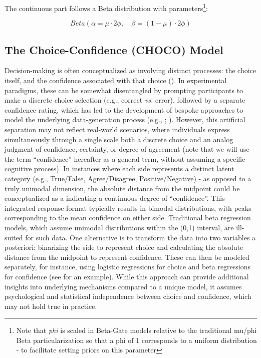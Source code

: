 \documentclass[
  jou,
  floatsintext,
  longtable,
  nolmodern,
  notxfonts,
  notimes,
  colorlinks=true,linkcolor=blue,citecolor=blue,urlcolor=blue]{apa7}
\begin{document}
The continuous part follows a Beta distribution with
parameters\footnote{Note that \emph{phi} is scaled in Beta-Gate models
  relative to the traditional mu/phi Beta particularization so that a
  phi of 1 corresponds to a uniform distribution - to facilitate setting
  priors on this parameter}:

\[
Beta(\alpha = \mu \cdot 2 \phi, \quad \beta = (1 - \mu) \cdot 2 \phi)
\]

\subsection{The Choice-Confidence (CHOCO)
Model}\label{the-choice-confidence-choco-model}

Decision-making is often conceptualized as involving distinct processes:
the choice itself, and the confidence associated with that choice
(). In
experimental paradigms, these can be somewhat disentangled by prompting
participants to make a discrete choice selection (e.g., correct
\emph{vs.} error), followed by a separate confidence rating, which has
led to the development of bespoke approaches to model the underlying
data-generation process (e.g., ; ).
However, this artificial separation may not reflect real-world
scenarios, where individuals express simultaneously through a single
scale both a discrete choice and an analog judgment of confidence,
certainty, or degree of agreement (note that we will use the term
``confidence'' hereafter as a general term, without assuming a specific
cognitive process). In instances where each side represents a distinct
latent category (e.g., True/False, Agree/Disagree, Positive/Negative) -
as opposed to a truly unimodal dimension, the absolute distance from the
midpoint could be conceptualized as a indicating a continuous degree of
``confidence''. This integrated response format typically results in
bimodal distributions, with peaks corresponding to the mean confidence
on either side. Traditional beta regression models, which assume
unimodal distributions within the (0,1) interval, are ill-suited for
such data. One alternative is to transform the data into two variables a
posteriori: binarizing the side to represent choice and calculating the
absolute distance from the midpoint to represent confidence. These can
then be modeled separately, for instance, using logistic regressions for
choice and beta regressions for confidence (see
 for an
example). While this approach can provide additional insights into
underlying mechanisms compared to a unique model, it assumes
psychological and statistical independence between choice and
confidence, which may not hold true in practice.
\end{document}
